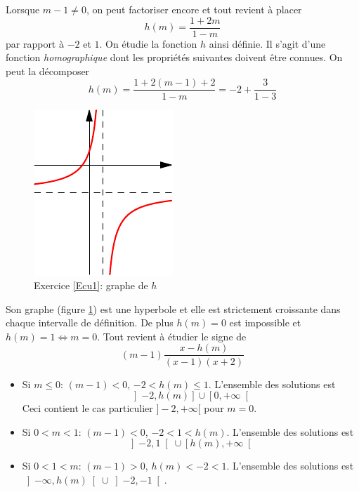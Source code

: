 Lorsque $m-1\neq 0$, on peut factoriser encore et tout revient à placer 
\begin{displaymath}
 h(m) = \frac{1+2m}{1-m}
\end{displaymath}
par rapport à $-2$ et $1$. On étudie la fonction $h$ ainsi définie. Il s'agit d'une fonction \emph{homographique} dont les propriétés suivantes doivent être connues.\newline
On peut la décomposer
\begin{displaymath}
 h(m) = \frac{1+2(m-1)+2}{1-m}
= -2 + \frac{3}{1-3}
\end{displaymath}
\begin{figure}[h!]
 \centering
 \includegraphics{./Ccu01_1.pdf}
 \caption{Exercice \ref{Ecu1}: graphe de $h$}
 \label{fig:Ccu1_1}
\end{figure}
Son graphe (figure \ref{fig:Ccu1_1}) est une hyperbole et elle est strictement croissante dans chaque intervalle de définition. De plus $h(m)=0$ est impossible et $h(m)=1\Leftrightarrow m=0$.
Tout revient à étudier le signe de
\begin{displaymath}
 (m-1)\frac{x-h(m)}{(x-1)(x+2)}
\end{displaymath}
\begin{itemize}
 \item Si $m\leq 0$: $(m-1)<0$, $-2<h(m)\leq 1$. L'ensemble des solutions est
\begin{displaymath}
 \left] -2,h(m)\right] \cup \left[ 0, +\infty\right[ 
\end{displaymath}
Ceci contient le cas particulier $]-2,+\infty[$ pour $m=0$.
\item Si $0 < m < 1$: $(m-1)<0$, $-2< 1 < h(m)$. L'ensemble des solutions est
\begin{displaymath}
 \left] -2,1\right[ \cup \left[ h(m), +\infty\right[ 
\end{displaymath}
\item Si $0 < 1 < m$: $(m-1)>0$, $h(m) < -2< 1$. L'ensemble des solutions est
$
 \left] -\infty,h(m)\right[ \cup \left]-2, -1\right[ 
$.
\end{itemize}

